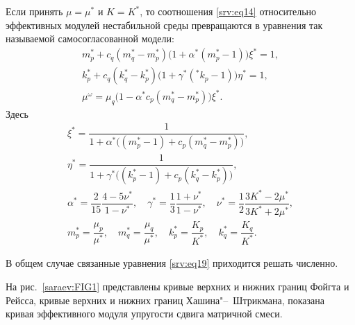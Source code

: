 Если принять $\mu = \mu^{*}$ и $K=K^{*}$, то соотношения \eqref{srv:eq14} относительно эффективных модулей нестабильной среды превращаются в уравнения так называемой самосогласованной модели:
\begin{equation}\label{srv:eq19}
\begin{array}{ll}
m^{*}_{p}+c_{q} (m^{*}_{q}-m^{*}_{p}) \big(1+\alpha^{*} (m^{*}_{p}-1 )\big) \xi^{*}=1,\\[2mm]
k^{*}_{p}+c_{q} (k^{*}_{q}-k^{*}_{p} )\big(1+\gamma^{*} (^{*}k_{p}-1 )\big) \eta^{*}=1,\\[2mm]
\mu^{\omega}=\mu_{q} \big(1-\alpha^{*} c_{p}  (m^{*}_{q}-m^{*}_{p} )\big) \xi^{*}.
\end{array}
\end{equation}
Здесь  
\begin{equation}
\begin{array}{c}
\xi^{*}=\dfrac{1}{1+\alpha^{*}  \big( (m_{p}^{*}-1 )+c_{p} (m_{q}^{*}-m_{p}^{*})\big)},\\[2mm]
\eta^{*}=\dfrac{1}{1+\gamma^{*} \big( (k_{p}^{*}-1 )+c_{p} (k_{q}^{*}-k_{p}^{*})\big)},\\[2mm]
\alpha^{*}=\dfrac{2}{15} \dfrac{4-5\nu^{*}}{1-\nu^{*}}, \quad \gamma^{*}=\dfrac{1}{3} \dfrac{1+\nu^{*}}{1-\nu^{*}}, \quad \nu^{*}=\dfrac{1}{2} \dfrac{3K^{*}-2\mu^{*}}{3K^{*}+2\mu^{*}},\\[2mm]
m^{*}_{p}=\dfrac{\mu_{p}}{\mu^{*}}, \quad m^{*}_{q}=\dfrac{\mu_{q}}{\mu^{*}},\quad k^{*}_{p}=\dfrac{K_{p}}{K^{*}}, \quad k^{*}_{q}=\dfrac{K_{q}}{K^{*}}.
\end{array}
\end{equation}


В общем случае связанные уравнения \eqref{srv:eq19} приходится решать численно.

На рис.~\ref{saraev:FIG1} представлены кривые верхних и нижних границ Фойгта и Рейсса, кривые верхних и нижних границ Хашина"--~Штрикмана, показана кривая эффективного модуля упругости сдвига матричной смеси.

